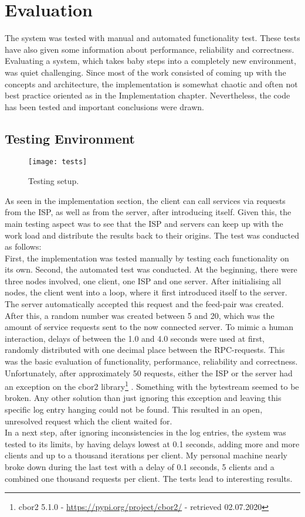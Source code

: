 \chapter{Evaluation}
The system was tested with manual and automated functionality test. These tests have also given some information about performance, reliability and correctness. Evaluating a system, which takes baby steps into a completely new environment, was quiet challenging. Since most of the work consisted of coming up with the concepts and architecture, the implementation is somewhat chaotic and often not best practice oriented as in the Implementation chapter. Nevertheless, the code has been tested and important conclusions were drawn.
\section{Testing Environment}
\begin{figure}
    \centering
    \texttt{[image: tests]}
    \caption{Testing setup.}
    \label{fig:tests}
\end{figure}
As seen in the implementation section, the client can call services via requests from the ISP, as well as from the server, after introducing itself. Given this, the main testing aspect was to see that the ISP and servers can keep up with the work load and distribute the results back to their origins. The test was conducted as follows:\\
First, the implementation was tested manually by testing each functionality on its own. Second, the automated test was conducted. At the beginning, there were three nodes involved, one client, one ISP and one server. After initialising all nodes, the client went into a loop, where it first introduced itself to the server. The server automatically accepted this request and the feed-pair was created. After this, a random number was created between 5 and 20, which was the amount of service requests sent to the now connected server. To mimic a human interaction, delays of between the 1.0 and 4.0 seconds were used at first, randomly distributed with one decimal place between the RPC-requests. This was the basic evaluation of functionality, performance, reliability and correctness.\\
Unfortunately, after approximately 50 requests, either the ISP or the server had an exception on the cbor2 library\footnote{cbor2 5.1.0 - \url{https://pypi.org/project/cbor2/} - retrieved 02.07.2020} . Something with the bytestream seemed to be broken. Any other solution than just ignoring this exception and leaving this specific log entry hanging could not be found. This resulted in an open, unresolved request which the client waited for. \\
In a next step, after ignoring inconsistencies in the log entries, the system was tested to its limits, by having delays lowest at 0.1 seconds, adding more and more clients and up to a thousand iterations per client. My personal machine nearly broke down during the last test with a delay of 0.1 seconds, 5 clients and a combined one thousand requests per client. The tests lead to interesting results.

